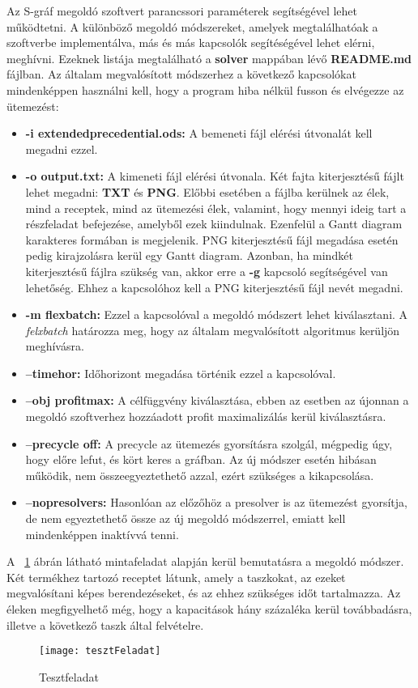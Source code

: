 Az S-gráf megoldó szoftvert parancssori paraméterek segítségével lehet működtetni. A különböző megoldó módszereket, amelyek megtalálhatóak a szoftverbe implementálva, más és más kapcsolók segítéségével lehet elérni, meghívni. Ezeknek listája megtalálható a \textbf{solver} mappában lévő \textbf{README.md} fájlban. Az általam megvalósított módszerhez a következő kapcsolókat mindenképpen használni kell, hogy a program hiba nélkül fusson és elvégezze az ütemezést:
\begin{itemize}
	\item \textbf{-i extended\textunderscore precedential.ods:} A bemeneti fájl elérési útvonalát kell megadni ezzel.
	\item \textbf{-o output.txt:} A kimeneti fájl elérési útvonala. Két fajta kiterjesztésű fájlt lehet megadni: \textbf{TXT} és \textbf{PNG}. Előbbi esetében a fájlba kerülnek az élek, mind a receptek, mind az ütemezési élek, valamint, hogy mennyi ideig tart a részfeladat befejezése, amelyből ezek kiindulnak. Ezenfelül a Gantt diagram karakteres formában is megjelenik. PNG kiterjesztésű fájl megadása esetén pedig kirajzolásra kerül egy Gantt diagram. Azonban, ha mindkét kiterjesztésű fájlra szükség van, akkor erre a \textbf{-g} kapcsoló segítségével van lehetőség. Ehhez a kapcsolóhoz kell a PNG kiterjesztésű fájl nevét megadni.
	\item \textbf{-m flexbatch:} Ezzel a kapcsolóval a megoldó módszert lehet kiválasztani. A \textit{felxbatch} határozza meg, hogy az általam megvalósított algoritmus kerüljön meghívásra.
	\item \textbf{--timehor:} Időhorizont megadása történik ezzel a kapcsolóval.
	\item \textbf{--obj profit\textunderscore max:} A célfüggvény kiválasztása, ebben az esetben az újonnan a megoldó szoftverhez hozzáadott profit maximalizálás kerül kiválasztásra.
	\item \textbf{--precycle off:} A precycle az ütemezés gyorsításra szolgál, mégpedig úgy, hogy előre lefut, és kört keres a gráfban. Az új módszer esetén hibásan működik, nem összeegyeztethető azzal, ezért szükséges a kikapcsolása.
	\item \textbf{--nopresolvers:} Hasonlóan az előzőhöz a presolver is az ütemezést gyorsítja, de nem egyeztethető össze az új megoldó módszerrel, emiatt kell mindenképpen inaktívvá tenni.
\end{itemize}

A ~\ref{tesztFeladat} ábrán látható mintafeladat alapján kerül bemutatásra a megoldó módszer. Két termékhez tartozó receptet látunk, amely a taszkokat, az ezeket megvalósítani képes berendezéseket, és az ehhez szükséges időt tartalmazza. Az éleken megfigyelhető még, hogy a kapacitások hány százaléka kerül továbbadásra, illetve a következő taszk által felvételre.
\begin{figure}[H]
\begin{center}
\texttt{[image: tesztFeladat]}
\caption{Tesztfeladat}
\label{tesztFeladat}
\end{center}
\end{figure}

